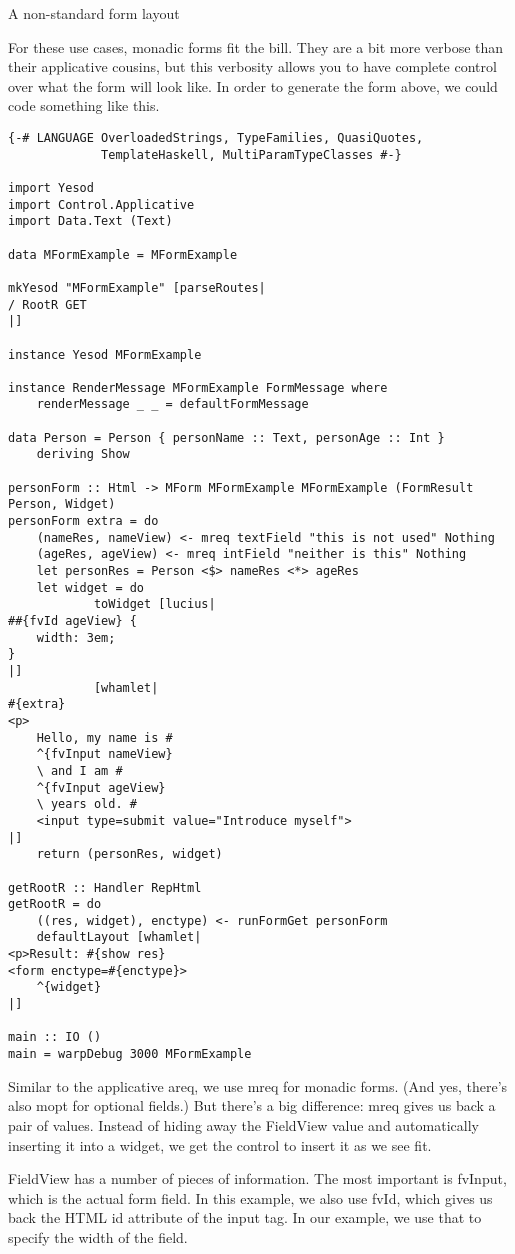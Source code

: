 A non-standard form layout

For these use cases, monadic forms fit the bill. They are a bit more verbose than their applicative cousins, but this verbosity allows you to have complete control over what the form will look like. In order to generate the form above, we could code something like this.

\begin{lstlisting}
{-# LANGUAGE OverloadedStrings, TypeFamilies, QuasiQuotes,
             TemplateHaskell, MultiParamTypeClasses #-}

import Yesod
import Control.Applicative
import Data.Text (Text)

data MFormExample = MFormExample

mkYesod "MFormExample" [parseRoutes|
/ RootR GET
|]

instance Yesod MFormExample

instance RenderMessage MFormExample FormMessage where
    renderMessage _ _ = defaultFormMessage

data Person = Person { personName :: Text, personAge :: Int }
    deriving Show

personForm :: Html -> MForm MFormExample MFormExample (FormResult Person, Widget)
personForm extra = do
    (nameRes, nameView) <- mreq textField "this is not used" Nothing
    (ageRes, ageView) <- mreq intField "neither is this" Nothing
    let personRes = Person <$> nameRes <*> ageRes
    let widget = do
            toWidget [lucius|
##{fvId ageView} {
    width: 3em;
}
|]
            [whamlet|
#{extra}
<p>
    Hello, my name is #
    ^{fvInput nameView}
    \ and I am #
    ^{fvInput ageView}
    \ years old. #
    <input type=submit value="Introduce myself">
|]
    return (personRes, widget)

getRootR :: Handler RepHtml
getRootR = do
    ((res, widget), enctype) <- runFormGet personForm
    defaultLayout [whamlet|
<p>Result: #{show res}
<form enctype=#{enctype}>
    ^{widget}
|]

main :: IO ()
main = warpDebug 3000 MFormExample
\end{lstlisting}

Similar to the applicative areq, we use mreq for monadic forms. (And yes, there's also mopt for optional fields.) But there's a big difference: mreq gives us back a pair of values. Instead of hiding away the FieldView value and automatically inserting it into a widget, we get the control to insert it as we see fit.

FieldView has a number of pieces of information. The most important is fvInput, which is the actual form field. In this example, we also use fvId, which gives us back the HTML id attribute of the input tag. In our example, we use that to specify the width of the field.

